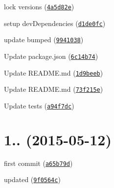 \begin{DoxyItemize}
\item lock versions (\href{https://github.com/kikobeats/emojis-list/commit/4a5d82e}{\tt 4a5d82e})
\item setup dev\+Dependencies (\href{https://github.com/kikobeats/emojis-list/commit/d1de0fc}{\tt d1de0fc})
\item update bumped (\href{https://github.com/kikobeats/emojis-list/commit/9941038}{\tt 9941038})
\item Update package.\+json (\href{https://github.com/kikobeats/emojis-list/commit/6c14b74}{\tt 6c14b74})
\item Update R\+E\+A\+D\+M\+E.\+md (\href{https://github.com/kikobeats/emojis-list/commit/1d9beeb}{\tt 1d9beeb})
\item Update R\+E\+A\+D\+M\+E.\+md (\href{https://github.com/kikobeats/emojis-list/commit/73f215e}{\tt 73f215e})
\item Update tests (\href{https://github.com/kikobeats/emojis-list/commit/a94f7dc}{\tt a94f7dc})
\end{DoxyItemize}

\label{_1.0.0}%
 \section*{1.. (2015-\/05-\/12)}


\begin{DoxyItemize}
\item first commit (\href{https://github.com/kikobeats/emojis-list/commit/a65b79d}{\tt a65b79d})
\item updated (\href{https://github.com/kikobeats/emojis-list/commit/9f0564c}{\tt 9f0564c}) 
\end{DoxyItemize}